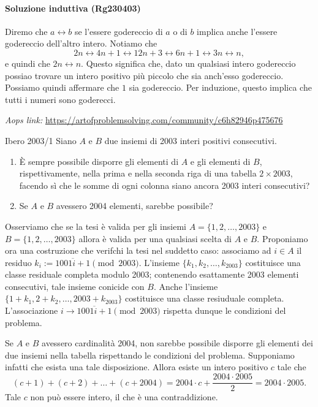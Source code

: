 \documentclass{article}
\begin{document}
\paragraph{Soluzione induttiva (Rg230403)}
Diremo che $a\leftrightarrow b$ se l'essere godereccio
di $a$ o di $b$ implica anche l'essere godereccio dell'altro intero.
Notiamo che
\begin{equation*}
	2n\leftrightarrow 4n+1
		\leftrightarrow 12n+3
		\leftrightarrow 6n+1
		\leftrightarrow 3n
		\leftrightarrow n,
\end{equation*}
e quindi che $2n\leftrightarrow n$. Questo significa che, dato un qualsiasi
intero godereccio possiao trovare un intero positivo più piccolo che sia
anch'esso godereccio. Possiamo quindi affermare che $1$ sia godereccio.
Per induzione, questo implica che tutti i numeri sono goderecci.

\vspace{0.5cm}
\textit{Aops link:}
\href{https://artofproblemsolving.com/community/c6h82946p475676}
{https://artofproblemsolving.com/community/c6h82946p475676}

\begin{proposition}{Ibero 2003/1}{}
	Siano $A$ e $B$ due insiemi di
	2003 interi positivi consecutivi.
	\begin{enumerate}
		\item È sempre possibile disporre gli elementi di $A$ e gli
			elementi di $B$, rispettivamente, nella prima e nella seconda
			riga di una tabella $2\times 2003$, facendo sì che le
			somme di ogni colonna siano ancora 2003 interi consecutivi?
		\item Se $A$ e $B$ avessero 2004 elementi, sarebbe possibile?
	\end{enumerate}
\end{proposition}

Osserviamo che se la tesi è valida per gli insiemi
$A=\{1,2,\dots,2003\}$ e $B=\{1,2,\dots,2003\}$ allora
è valida per una qualsiasi scelta di $A$ e $B$. Proponiamo ora una
costruzione che verifchi la tesi nel suddetto caso: associamo ad $i\in A$
il residuo $k_i:=\overline{1001i+1} \pmod{2003}$.
L'insieme $\{k_1,k_2,\dots,k_{2003}\}$ costituisce una classe residuale
completa modulo 2003; contenendo esattamente 2003 elementi consecutivi,
tale insieme conicide con $B$. Anche l'insieme
$\{1+k_1,2+k_2,\dots,2003+k_{2003}\}$ costituisce una classe resiuduale
completa. L'associazione $i\to \overline{1001i+1} \pmod{2003}$
rispetta dunque le condizioni del problema.

Se $A$ e $B$ avessero cardinalità 2004, non sarebbe possibile
disporre gli elementi dei due insiemi nella tabella rispettando le
condizioni del problema. Supponiamo infatti che esista una tale disposizione.
Allora esiste un intero positivo $c$ tale che
\begin{equation*}
	(c+1)+(c+2)+\dots+(c+2004)=2004\cdot c+\frac{2004\cdot 2005}{2}=2004\cdot 2005.
\end{equation*}
Tale $c$ non può essere intero, il che è una contraddizione.
\end{document}
